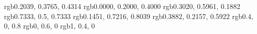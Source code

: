 
\makeatletter



\newcommand{\customtoday}{\the\year/\two@digits{\the\month}/\two@digits{\the\day}}
\newcommand{\customdate}{\customtoday\ \currenttime\ (\jadayofweek{\the\year}{\the\month}{\the\day})}
\newcommand{\customtodayap}{\ifnum\currenthour<12 \customtoday\,a.m.\else\customtoday\,p.m.\fi}
\newif\if@backmatter%
\newif\if@frontmatter%
\newif\if@appendix%
\setlength{\kanjiskip}{0.0pt plus 0.4pt minus 0.5pt}
\setlength{\xkanjiskip}{2.40555pt plus 1.0pt minus 1.0pt}
\newcommand{\hk}{\hspace{\kanjiskip}} %
\newcommand{\hx}{\hspace{\xkanjiskip}} %
\definecolor{ai}     {rgb}{0.2039, 0.3765, 0.4314}
\definecolor{kon}    {rgb}{0.0000, 0.2000, 0.4000}
\definecolor{moegi}  {rgb}{0.3020, 0.5961, 0.1882}
\definecolor{sssec}  {rgb}{0.7333, 0.5, 0.7333}
\definecolor{sora}   {rgb}{0.1451, 0.7216, 0.8039}
\definecolor{sumire} {rgb}{0.3882, 0.2157, 0.5922}
\definecolor{wwqqcc} {rgb}{0.4, 0, 0.8}
\definecolor{qqzzqq} {rgb}{0, 0.6, 0}
\definecolor{ffwwqq} {rgb}{1, 0.4, 0}
\newcommand{\pageautoref}[1]{%
  \ifthenelse{\equal{\pageref{#1}}{\thepage}}%
    {\autoref{#1}}%
    {\autoref{#1}~[p.\pageref{#1}]}%
}
\newcommand{\pageeqref}[1]{%
  \ifthenelse{\equal{\pageref{#1}}{\thepage}}%
    {\eqref{#1}}%
    {\eqref{#1}~[p.\pageref{#1}]}%
}
